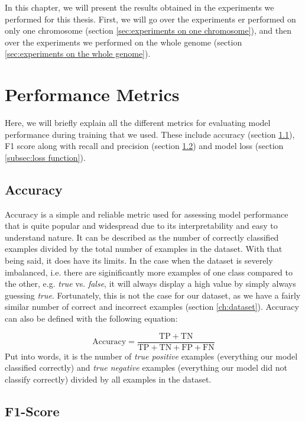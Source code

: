 \documentclass[times, utf8, diplomski, english]{fer_eng}
\begin{document}
In this chapter, we will present the results obtained in the experiments we performed for this thesis. First, we will go over the experiments er performed on only one chromosome (section \ref{sec:experiments on one chromosome}), and then over the experiments we performed on the whole genome (section \ref{sec:experiments on the whole genome}).

\section{Performance Metrics}

Here, we will briefly explain all the different metrics for evaluating model performance during training that we used. These include accuracy (section \ref{subsec:accuracy}), F1 score along with recall and precision (section \ref{subsec:f1 score}) and model loss (section \ref{subsec:loss function}).

\subsection{Accuracy}
\label{subsec:accuracy}

Accuracy is a simple and reliable metric used for assessing model performance that is quite popular and widespread due to its interpretability and easy to understand nature. It can be described as the number of correctly classified examples divided by the total number of examples in the dataset. With that being said, it does have its limits. In the case when the dataset is severely imbalanced, i.e. there are siginificantly more examples of one class compared to the other, e.g. \textit{true} vs. \textit{false}, it will always display a high value by simply always guessing \textit{true}. Fortunately, this is not the case for our dataset, as we have a fairly similar number of correct and incorrect examples (section \ref{ch:dataset}). Accuracy can also be defined with the following equation:

\[ \mathrm{Accuracy} = \frac{\mathrm{TP} + \mathrm{TN}}{\mathrm{TP} + \mathrm{TN} + \mathrm{FP} + \mathrm{FN}} \]
Put into words, it is the number of \textit{true positive} examples (everything our model classified correctly) and \textit{true negative} examples (everything our model did not classify correctly) divided by all examples in the dataset.

\subsection{F1-Score}
\label{subsec:f1 score}
\end{document}
